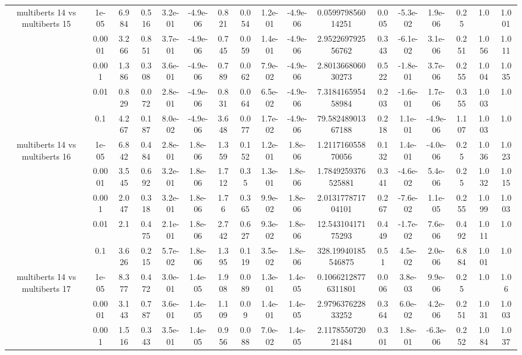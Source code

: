 \begin{tabular}{|c|c|c|c|c|c|c|c|c|c|c|c|c|c|c|c|c|}
\hline
\multirow{5}{*}{multiberts 14 vs multiberts 15} & 1e-05 & 6.984 & 0.516 & 3.2e-01 & -4.9e-06 & 0.821 & 0.054 & 1.2e-01 & -4.9e-06 & 0.059979856014251 & 0.005 & -5.3e-02 & 1.9e-06 & 0.25 & 1.0 & 1.001 \\
 & 0.0001 & 3.266 & 0.851 & 3.7e-01 & -4.9e-06 & 0.745 & 0.059 & 1.4e-01 & -4.9e-06 & 2.952269792556762 & 0.343 & -6.1e-02 & 3.1e-06 & 0.251 & 1.056 & 1.011 \\
 & 0.001 & 1.386 & 0.308 & 3.6e-01 & -4.9e-06 & 0.789 & 0.062 & 7.9e-02 & -4.9e-06 & 2.801366806030273 & 0.522 & -1.8e-01 & 3.7e-06 & 0.255 & 1.004 & 1.035 \\
 & 0.01 & 0.829 & 0.072 & 2.8e-01 & -4.9e-06 & 0.831 & 0.064 & 6.5e-02 & -4.9e-06 & 7.318416595458984 & 0.203 & -1.6e-01 & 1.7e-06 & 0.355 & 1.003 & 1.0 \\
 & 0.1 & 4.267 & 0.187 & 8.0e-02 & -4.9e-06 & 3.648 & 0.077 & 1.7e-02 & -4.9e-06 & 79.58248901367188 & 0.218 & 1.1e-01 & -4.9e-06 & 1.107 & 1.003 & 1.0 \\
\hline
\multirow{5}{*}{multiberts 14 vs multiberts 16} & 1e-05 & 6.842 & 0.484 & 2.8e-01 & 1.8e-06 & 1.359 & 0.152 & 1.2e-01 & 1.8e-06 & 1.211716055870056 & 0.132 & 1.4e-01 & -4.0e-06 & 0.25 & 1.036 & 1.023 \\
 & 0.0001 & 3.545 & 0.692 & 3.2e-01 & 1.8e-06 & 1.712 & 0.35 & 1.3e-01 & 1.8e-06 & 1.7849259376525881 & 0.341 & -4.6e-02 & 5.4e-06 & 0.25 & 1.032 & 1.015 \\
 & 0.001 & 2.047 & 0.318 & 3.2e-01 & 1.8e-06 & 1.76 & 0.365 & 9.9e-02 & 1.8e-06 & 2.013177871704101 & 0.267 & -7.6e-02 & 1.1e-05 & 0.255 & 1.099 & 1.003 \\
 & 0.01 & 2.1 & 0.475 & 2.1e-01 & 1.8e-06 & 2.742 & 0.627 & 9.3e-02 & 1.8e-06 & 12.54310417175293 & 0.449 & -1.7e-02 & 7.6e-06 & 0.492 & 1.011 & 1.0 \\
 & 0.1 & 3.626 & 0.215 & 5.7e-02 & 1.8e-06 & 1.395 & 0.119 & 3.5e-02 & 1.8e-06 & 328.19940185546875 & 0.51 & 4.5e-02 & 2.0e-06 & 6.884 & 1.001 & 1.0 \\
\hline
\multirow{5}{*}{multiberts 14 vs multiberts 17} & 1e-05 & 8.377 & 0.472 & 3.0e-01 & 1.4e-05 & 1.908 & 0.089 & 1.3e-01 & 1.4e-05 & 0.10662128776311801 & 0.006 & 3.8e-03 & 9.9e-06 & 0.25 & 1.0 & 1.06 \\
 & 0.0001 & 3.143 & 0.787 & 3.6e-01 & 1.4e-05 & 1.109 & 0.09 & 1.4e-01 & 1.4e-05 & 2.979637622833252 & 0.364 & 6.0e-02 & 4.2e-06 & 0.251 & 1.031 & 1.003 \\
 & 0.001 & 1.516 & 0.343 & 3.5e-01 & 1.4e-05 & 0.956 & 0.088 & 7.0e-02 & 1.4e-05 & 2.117855072021484 & 0.301 & 1.8e-01 & -6.3e-06 & 0.252 & 1.084 & 1.037 \\

\end{tabular}
